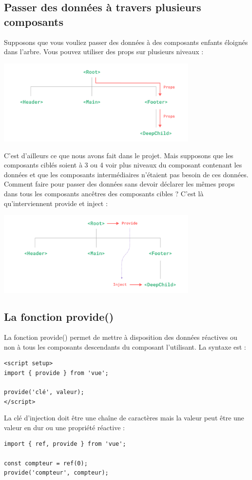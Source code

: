 \subsection{Passer des données à travers plusieurs composants}
Supposons que vous vouliez passer des données à des composants enfants éloignés dans l'arbre. Vous pouvez utiliser des {\color{monOrange}props} sur plusieurs niveaux :
\begin{center}
\includegraphics[width=10cm]{images/image11.png}
\end{center}

C'est d'ailleurs ce que nous avons fait dans le projet. Mais supposons que les composants ciblés soient à 3 ou 4 voir plus niveaux du composant contenant les données et que les composants intermédiaires n'étaient pas besoin de ces données. Comment faire pour passer des données sans devoir déclarer les mêmes {\color{monOrange}props} dans tous les composants ancêtres des composants cibles ? C'est là qu'interviennent {\color{monOrange}provide} et {\color{monOrange}inject} :
\begin{center}
\includegraphics[width=10cm]{images/image12.png}
\end{center}

\subsection{La fonction {\color{monOrange}provide()}}
La fonction {\color{monOrange}provide()} permet de mettre à disposition des données réactives ou non à tous les composants descendants du composant l'utilisant. La syntaxe est :
\begin{verbatim}
<script setup>
import { provide } from 'vue';

provide('clé', valeur);
</script>
\end{verbatim}
La clé d'injection doit être une chaîne de caractères mais la valeur peut être une valeur en dur ou une propriété réactive :
\begin{verbatim}
import { ref, provide } from 'vue';

const compteur = ref(0);
provide('compteur', compteur);
\end{verbatim}
